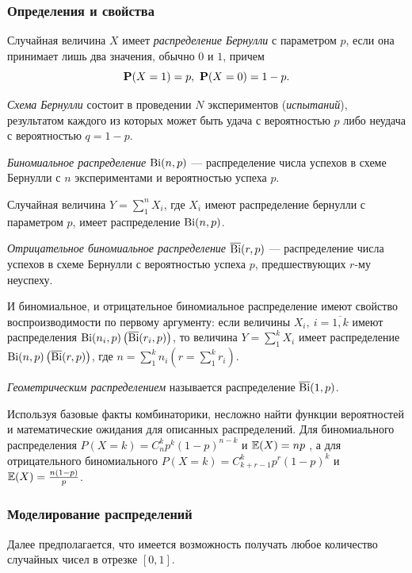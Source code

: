 \documentclass[12pt, a4paper]{article}
\begin{document}
\subsubsection{Определения и свойства}
\begin{df}
Случайная величина $X$ имеет \textit{распределение Бернулли} с параметром $p$, если она принимает лишь два значения, обычно $0$ и $1$, причем \[ \P(X = 1) = p,\ \P(X = 0) = 1-p. \]
\end{df}
\begin{df}
\textit{Схема Бернулли} состоит в проведении $N$ экспериментов (\textit{испытаний}), результатом каждого из которых может быть удача с вероятностью $p$ либо неудача с вероятностью $q=1-p$.
\end{df}
\begin{df}
\textit{Биномиальное распределение} $\Bi(n,p)$ --- распределение числа успехов в схеме Бернулли с $n$ экспериментами и вероятностью успеха $p$. 
\end{df}
Случайная величина $Y = \sum\limits_1^n X_i$, где $X_i$ имеют распределение бернулли с параметром $p$, имеет распределение $\Bi(n,p)$.
\begin{df}
\textit{Отрицательное биномиальное распределение} $\overline{\Bi}(r,p)$ --- распределение числа успехов в схеме Бернулли с вероятностью успеха $p$, предшествующих $r$-му неуспеху. 
\end{df}
И биномиальное, и отрицательное биномиальное распределение имеют свойство воспроизводимости по первому аргументу: если величины $X_i,\ i=\overline{1,k}$ имеют распределения $\Bi(n_i,p) \left( \overline{\Bi}(r_i,p) \right)$, то величина $Y = \sum\limits_1^k X_i$ имеет распределение $\Bi(n,p)  \left( \overline{\Bi}(r,p) \right)$, где $n=\sum\limits_{1}^{k}n_i \left( r = \sum\limits_{1}^{k}r_i \right)$.
\begin{df}
\textit{Геометрическим распределением} называется распределение $\overline{\Bi}(1,p)$.
\end{df}

Используя базовые факты комбинаторики, несложно найти функции вероятностей и математические ожидания для описанных распределений. Для биномиального распределения $P(X = k) = C_n^k p^k(1-p)^{n-k}$ и $\E(X) = np$ , а для отрицательного биномиального $P(X = k) = C_{k+r-1}^{k}p^r(1-p)^k$ и $\E(X)=\frac{n(1-p)}{p}$.

\subsubsection{Моделирование распределений}
Далее предполагается, что имеется возможность получать любое количество случайных чисел в отрезке $\left[0,1\right]$.
\end{document}

